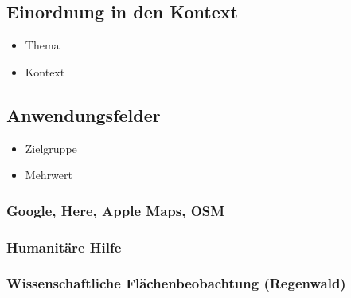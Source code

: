 \subsection{Einordnung in den Kontext}
\begin{itemize}
	\item Thema
	\item Kontext
\end{itemize}

\subsection{Anwendungsfelder}
\begin{itemize}
	\item Zielgruppe
	\item Mehrwert
\end{itemize}
\subsubsection{Google, Here, Apple Maps, OSM}
\subsubsection{Humanitäre Hilfe}
\subsubsection{Wissenschaftliche Flächenbeobachtung (Regenwald)}


